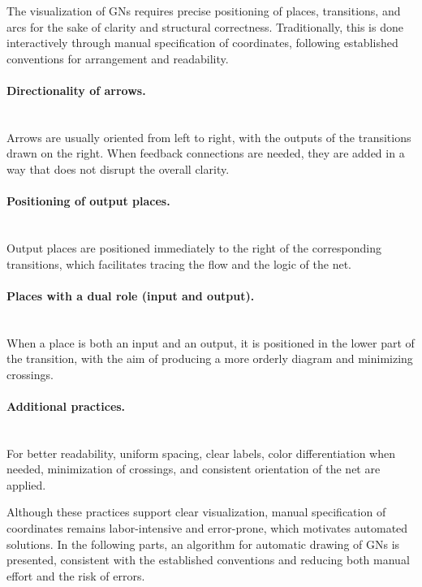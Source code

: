 \hspace*{2.5em}The visualization of GNs requires precise positioning of places, transitions, and arcs for the sake of clarity and structural correctness. Traditionally, this is done interactively through manual specification of coordinates, following established conventions for arrangement and readability.

\paragraph{Directionality of arrows.}
\mbox{}\\
Arrows are usually oriented from left to right, with the outputs of the transitions drawn on the right. When feedback connections are needed, they are added in a way that does not disrupt the overall clarity.

\paragraph{Positioning of output places.}
\mbox{}\\
Output places are positioned immediately to the right of the corresponding transitions, which facilitates tracing the flow and the logic of the net.

\paragraph{Places with a dual role (input and output).}
\mbox{}\\
When a place is both an input and an output, it is positioned in the lower part of the transition, with the aim of producing a more orderly diagram and minimizing crossings.

\paragraph{Additional practices.}
\mbox{}\\
For better readability, uniform spacing, clear labels, color differentiation when needed, minimization of crossings, and consistent orientation of the net are applied.

Although these practices support clear visualization, manual specification of coordinates remains labor-intensive and error-prone, which motivates automated solutions. In the following parts, an algorithm for automatic drawing of GNs is presented, consistent with the established conventions and reducing both manual effort and the risk of errors.

